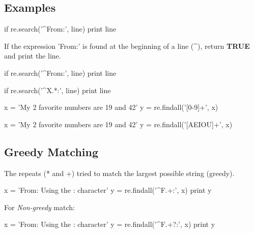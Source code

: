 \documentclass[a4paper,12pt]{report}
\begin{document}
\subsection{Examples}

\begin{tcolorbox}
\begin{python}
if re.search('^From:', line)
	print line
\end{python}
\end{tcolorbox}

If the expression 'From:' is found at the beginning of a line (\^{}), return \textbf{\textcolor[rgb]{0,0.58,0}{TRUE}} and print the line.
\begin{tcolorbox}
\begin{python}
if re.search('^From:', line) 
	print line
\end{python}
\end{tcolorbox}

\begin{tcolorbox}
\begin{python}
if re.search('^X.*:', line)
	print line
\end{python}
\end{tcolorbox}
\begin{tcolorbox}
\begin{python}
x = 'My 2 favorite numbers are 19 and 42'
y = re.findall('[0-9]+', x) %
\end{python}
\end{tcolorbox}
\begin{tcolorbox}
\begin{python}
x = 'My 2 favorite numbers are 19 and 42'
y = re.findall('[AEIOU]+', x)  %
\end{python}
\end{tcolorbox}

\subsection{Greedy Matching}
The repeats (* and +) tried to match the largest possible string (greedy).\\
\begin{tcolorbox}
\begin{python}
x = 'From: Using the : character'
y = re.findall('^F.+:', x)
print y
\end{python}
\end{tcolorbox}
For \textit{Non-greedy} match:\\
\begin{tcolorbox}
\begin{python}
x = 'From: Using the : character'
y = re.findall('^F.+?:', x)
print y
\end{python}
\end{tcolorbox}
\end{document}
